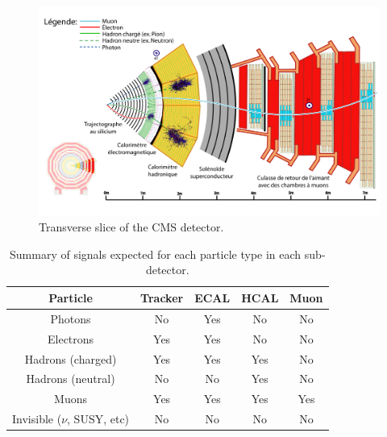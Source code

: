 \begin{figure}[h]
	\centering
	\includegraphics[width=1.0\linewidth]{Figures/CMS_slice_white_colour_french_291016}
	\caption{Transverse slice of the CMS detector\cite{Barney:2628641}.}
	\label{fig:cmsslicewhitecolourfrench291016}
\end{figure}



\begin{table}[h]
	\centering
\begin{tabular}{|c|c|c|c|c|}
	\hline 
	Particle & Tracker & ECAL & HCAL & Muon \\ 
	\hline 
	Photons & No & Yes & No & No \\ 
	\hline 
	Electrons & Yes & Yes & No & No \\ 
	\hline 
	Hadrons (charged) & Yes & Yes & Yes & No \\ 
	\hline 
	Hadrons (neutral) & No & No & Yes & No \\ 
	\hline 
	Muons & Yes & Yes & Yes & Yes \\ 
	\hline 
	Invisible ($\nu$, SUSY, etc) & No & No & No & No \\ 
	\hline 
\end{tabular} 
\caption{Summary of signals expected for each particle type in each sub-detector.}
\label{table:subdetsignals}
\end{table}


